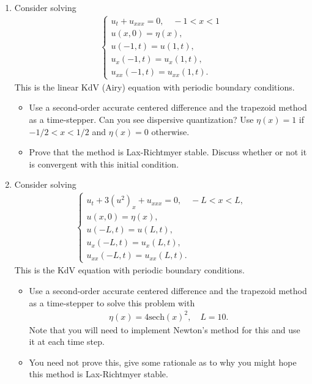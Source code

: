 \documentclass[10pt]{amsart}
\begin{document}
\mline
\begin{enumerate}[label={\bf Problem~{\arabic*}:}]
\item  Consider solving
  \begin{align*}
    \begin{cases} u_t + u_{xxx} = 0, \quad -1 < x < 1\\
      u(x,0) = \eta(x),\\
      u(-1,t) = u(1,t),\\
      u_x(-1,t) = u_x(1,t),\\
      u_{xx}(-1,t) = u_{xx}(1,t).\end{cases}
    \end{align*}
    This is the linear KdV (Airy) equation with periodic boundary conditions.
    \begin{itemize}
    \item Use a second-order accurate centered difference and the trapezoid method as a time-stepper. Can you see dispersive quantization? Use $\eta(x) = 1$ if $-1/2 < x < 1/2$ and $\eta(x) =0$ otherwise.
    \item Prove that the method is Lax-Richtmyer stable.  Discuss whether or not it is convergent with this initial condition.
    \end{itemize}

    \mline

  \item Consider solving
  \begin{align*}
    \begin{cases} u_t + 3 (u^2)_x + u_{xxx} = 0, \quad -L < x < L,\\
      u(x,0) = \eta(x),\\
      u(-L,t) = u(L,t),\\
      u_x(-L,t) = u_x(L,t),\\
      u_{xx}(-L,t) = u_{xx}(L,t).\end{cases}
    \end{align*}
    This is the KdV equation with periodic boundary conditions.
    \begin{itemize}
    \item Use a second-order accurate centered difference and the trapezoid method as a time-stepper to solve this problem with
      \begin{align*}
        \eta(x) = 4 \mathrm{sech}(x)^2, \quad L = 10.
      \end{align*}
      Note that you will need to implement Newton's method for this and use it at each time step.
    \item You need not prove this, give some rationale as to why you might hope this method is Lax-Richtmyer stable.  
    \end{itemize}
    

\end{enumerate}
\end{document}
